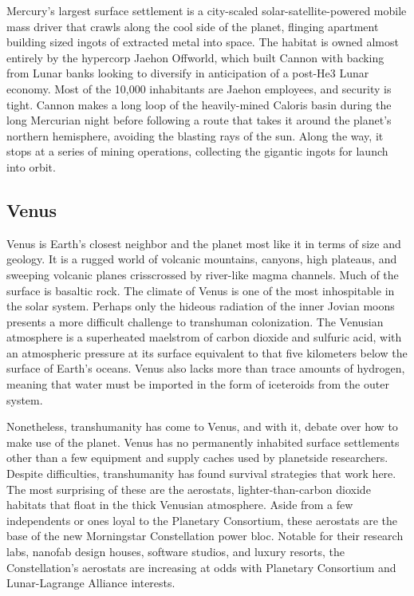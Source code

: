 Mercury's largest surface settlement is a city-scaled 
solar-satellite-powered mobile mass driver that crawls 
along the cool side of the planet, flinging apartment 
building sized ingots of extracted metal into space. 
The habitat is owned almost entirely by the hypercorp 
Jaehon Offworld, which built Cannon with backing 
from Lunar banks looking to diversify in anticipation 
of a post-He3 Lunar economy. Most of the 10,000 
inhabitants are Jaehon employees, and security is 
tight. Cannon makes a long loop of the heavily-mined 
Caloris basin during the long Mercurian night before 
following a route that takes it around the planet's 
northern hemisphere, avoiding the blasting rays of 
the sun. Along the way, it stops at a series of mining 
operations, collecting the gigantic ingots for launch 
into orbit.

\subsection{Venus}

Venus is Earth's closest neighbor and the planet most 
like it in terms of size and geology. It is a rugged 
world of volcanic mountains, canyons, high plateaus, 
and sweeping volcanic planes crisscrossed by river-like magma channels. Much of the surface is basaltic 
rock. The climate of Venus is one of the most inhospitable in the solar system. Perhaps only the hideous 
radiation of the inner Jovian moons presents a more 
difficult challenge to transhuman colonization. The 
Venusian atmosphere is a superheated maelstrom of 
carbon dioxide and sulfuric acid, with an atmospheric 
pressure at its surface equivalent to that five kilometers below the surface of Earth's oceans. Venus also 
lacks more than trace amounts of hydrogen, meaning 
that water must be imported in the form of iceteroids 
from the outer system.

Nonetheless, transhumanity has come to Venus, 
and with it, debate over how to make use of the 
planet. Venus has no permanently inhabited surface 
settlements other than a few equipment and supply 
caches used by planetside researchers. Despite difficulties, transhumanity has found survival strategies 
that work here. The most surprising of these are the 
aerostats, lighter-than-carbon dioxide habitats that 
float in the thick Venusian atmosphere. Aside from 
a few independents or ones loyal to the Planetary 
Consortium, these aerostats are the base of the new 
Morningstar Constellation power bloc. Notable for 
their research labs, nanofab design houses, software 
studios, and luxury resorts, the Constellation's aerostats are increasing at odds with Planetary Consortium and Lunar-Lagrange Alliance interests.


